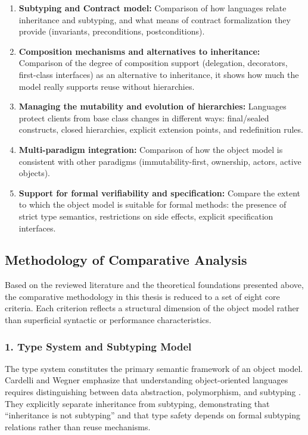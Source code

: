 \begin{enumerate}
    \item \textbf{Subtyping and Contract model:} Comparison of how languages relate inheritance and subtyping, and what means of contract formalization they provide (invariants, preconditions, postconditions).

    \item \textbf{Composition mechanisms and alternatives to inheritance:} Comparison of the degree of composition support (delegation, decorators, first-class interfaces) as an alternative to inheritance, it shows how much the model really supports reuse without hierarchies.

    \item \textbf{Managing the mutability and evolution of hierarchies:} Languages protect clients from base class changes in different ways: final/sealed constructs, closed hierarchies, explicit extension points, and redefinition rules.
 
    \item \textbf{Multi-paradigm integration:} Comparison of how the object model is consistent with other paradigms (immutability-first, ownership, actors, active objects).

    \item \textbf{Support for formal verifiability and specification:} Compare the extent to which the object model is suitable for formal methods: the presence of strict type semantics, restrictions on side effects, explicit specification interfaces.

\end{enumerate}


\subsection{Methodology of Comparative Analysis}

Based on the reviewed literature and the theoretical foundations presented above, the comparative methodology in this thesis is reduced to a set of eight core criteria. Each criterion reflects a structural dimension of the object model rather than superficial syntactic or performance characteristics.

\subsubsection{1. Type System and Subtyping Model}

The type system constitutes the primary semantic framework of an object model. Cardelli and Wegner emphasize that understanding object-oriented languages requires distinguishing between data abstraction, polymorphism, and subtyping \cite{cardelli1985understanding}. They explicitly separate inheritance from subtyping, demonstrating that “inheritance is not subtyping” and that type safety depends on formal subtyping relations rather than reuse mechanisms.

